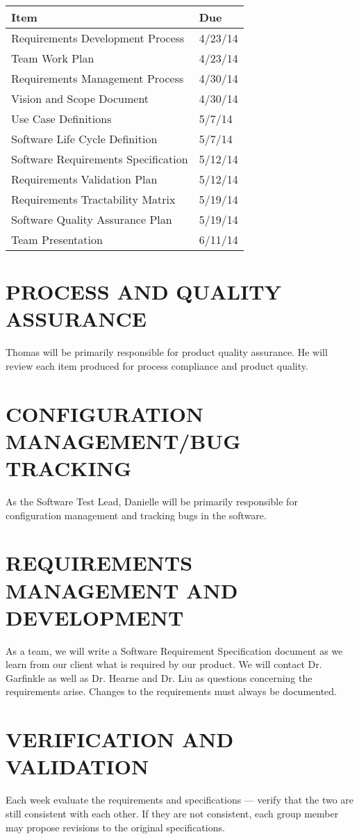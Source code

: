\documentclass[11pt]{article}
\begin{document}
\begin{tabularx}{\textwidth}{|X|l|}
	\hline
	\textbf{Item} & \textbf{Due}\\
	\hline
	Requirements Development Process & 4/23/14\\ \hline
	Team Work Plan & 4/23/14\\ \hline
	Requirements Management Process & 4/30/14\\ \hline
	Vision and Scope Document & 4/30/14\\ \hline
	Use Case Definitions & 5/7/14\\ \hline
	Software Life Cycle Definition & 5/7/14\\ \hline
	Software Requirements Specification & 5/12/14\\ \hline
	Requirements Validation Plan & 5/12/14\\ \hline
	Requirements Tractability Matrix & 5/19/14\\ \hline
	Software Quality Assurance Plan & 5/19/14\\ \hline
	Team Presentation & 6/11/14\\ \hline
\end{tabularx}

\section{PROCESS AND QUALITY ASSURANCE}
Thomas will be primarily responsible for product quality assurance. He will review each item produced for process compliance and product quality.

\section{CONFIGURATION MANAGEMENT/BUG TRACKING}
As the Software Test Lead, Danielle will be primarily responsible for configuration management and tracking bugs in the software.

\section{REQUIREMENTS MANAGEMENT AND DEVELOPMENT}
As a team, we will write a Software Requirement Specification document as we learn from our client what is required by our product. We will contact Dr. Garfinkle as well as Dr. Hearne and Dr. Liu as questions concerning the requirements arise. Changes to the requirements must always be documented.

\section{VERIFICATION AND VALIDATION}
Each week evaluate the requirements and specifications --- verify that the two are still consistent with each other. If they are not consistent, each group member may propose revisions to the original specifications.
\end{document}
